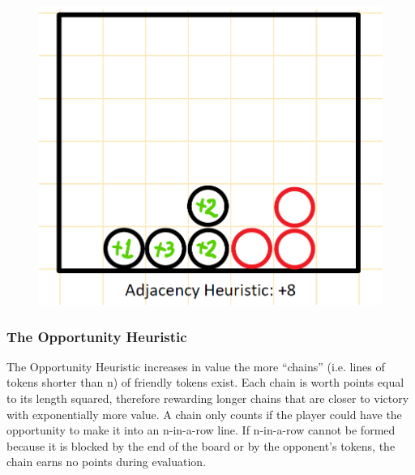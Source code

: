 \documentclass{article}
\begin{document}
\begin{figure}[h]
  \centering
  \includegraphics[width=0.45\linewidth]{Writeup/adj-util.jpg}
  \captionsetup{labelformat=empty}
  \label{fig:test1}
\end{figure}

\subsubsection*{The Opportunity Heuristic}
The Opportunity Heuristic increases in value the more “chains” (i.e. lines of tokens shorter than n) of friendly tokens exist. Each chain is worth points equal to its length squared, therefore rewarding longer chains that are closer to victory with exponentially more value. A chain only counts if the player could have the opportunity to make it into an n-in-a-row line. If n-in-a-row cannot be formed because it is blocked by the end of the board or by the opponent’s tokens, the chain earns no points during evaluation.
\end{document}
